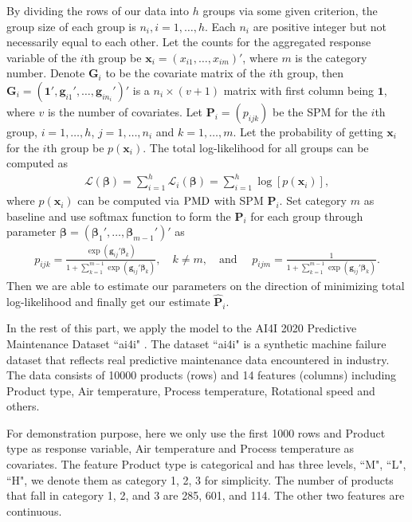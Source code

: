 \documentclass[12pt]{article}
\newcommand{\loglik}{\mathcal{L}}
\newcommand{\onevec}{{\boldsymbol{1}}}
\newcommand{\betavec}{{\boldsymbol{\beta}}}
\newcommand{\Pmat}{\mathbf{P}}
\newcommand{\Gmat}{\mathbf{G}}
\newcommand{\PMD}{{\normalfont\textrm{PMD}}}
\newcommand{\wh}{\widehat}
\newcommand{\xvec}{\boldsymbol{x}}
\newcommand{\gvec}{\boldsymbol{g}}
\begin{document}
By dividing the rows of our data into $h$ groups via some given criterion, the group size of each group is $n_i,i=1,\dots,h$. Each $n_i$ are positive integer but not necessarily equal to each other. Let the counts for the aggregated response variable of the $i$th group be
$\xvec_i = (x_{i1}, \dots,x_{im})'$, where $m$ is the category number. Denote $\Gmat_i$ to be the covariate matrix of the $i$th group, then $\Gmat_i = (\onevec', \gvec_{i 1}',\dots,\gvec_{i n_i}')'$ is a $n_i \times (v+1)$ matrix with first column being $\onevec$, where $v$ is the number of covariates. Let $\Pmat_i = (p_{ijk})$ be the SPM for the $i$th group, $i = 1, \dots, h$, $j = 1,\dots ,n_i$ and $k = 1,\dots, m$. Let the probability of getting $\xvec_i$ for the $i$th group be $p(\xvec_i)$. The total log-likelihood for all groups can be computed as
\begin{align*}
\loglik(\betavec) = \sum_{i=1}^{h}\loglik_i(\betavec) = \sum_{i=1}^{h}\log[p(\xvec_i)],
\end{align*}
where $p(\xvec_i)$ can be computed via $\PMD$ with SPM $\Pmat_i$. Set category $m$ as baseline and use softmax function to form the $\Pmat_i$ for each group through parameter $\betavec = (\betavec_1', \dots, \betavec_{m-1}')'$ as
\begin{align*}
    p_{i j k} = \frac{\exp{\left(\gvec_{ij}' \betavec_{k}\right)}}{1 + \sum_{k=1}^{m-1}\exp{\left( \gvec_{ij}' \betavec_{k} \right)}},
    \quad k \neq m, \quad \text{and } \quad
    p_{i j m} = \frac{1}{1 + \sum_{k=1}^{m-1}\exp{\left( \gvec_{ij}' \betavec_{k} \right)}}.
\end{align*}
Then we are able to estimate our parameters on the direction of minimizing total log-likelihood and finally get our estimate $\wh{\Pmat}_i$.

In the rest of this part, we apply the model to the
AI4I 2020 Predictive Maintenance Dataset ``ai4i"  \cite{Dua:2019}. The dataset ``ai4i" is a synthetic machine failure dataset that reflects real predictive maintenance data encountered in industry. The data consists of 10000 products (rows) and 14 features (columns) including Product type, Air temperature, Process temperature, Rotational speed and others.

For demonstration purpose, here we only use the first 1000 rows and Product type as response variable, Air temperature and Process temperature as covariates. The feature Product type is categorical and has three levels, ``M", ``L", ``H", we denote them as category 1, 2, 3 for simplicity. The number of products that fall in category 1, 2, and 3 are 285, 601, and 114. The other two features are continuous.
\end{document}
